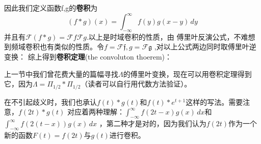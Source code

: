 \documentclass{ctexbook}
\begin{document}
因此我们定义函数f,g的\textbf{卷积}为
\begin{equation}
    (f*g)(x)=\int_{-\infty}^{\infty}f(y)g(x-y)\,dy
\end{equation}
并且有$\mathcal{F} (f*g)=\mathcal{F} f\mathcal{F} g$.以上是时域卷积的性质，由
傅里叶反演公式，不难想到频域卷积也有类似的性质。令$f=\mathcal{F} \mathfrak{f},g=\mathcal{F} \mathfrak{g}$
,对以上公式两边同时取傅里叶逆变换：
综上得到\textbf{卷积定理}(the convoluton thoerem)：

上一节中我们曾花费大量的篇幅寻找$\Lambda$的傅里叶变换，现在可以用卷积定理得到
它，因为$\Lambda=\Pi_{1/2}*\Pi_{1/2}$（读者可以自行用代数方法验证）。

在不引起歧义时，我们也承认$f(t)*g(t)$和$f(t)*e^{t+1}$这样的写法。需要注意，$f(2t)*g(t)$
对应着两种理解：$\int_{-\infty}^{\infty}f(2t-x)g(x)\,dx$和$\int_{-\infty}^{\infty}f(2(t-x))g(x)\,dx$
，第二种才是对的，因为我们认为$f(2t)$作为一个新的函数$F(t)=f(2t)$与$g(t)$进行卷积。
\end{document}
